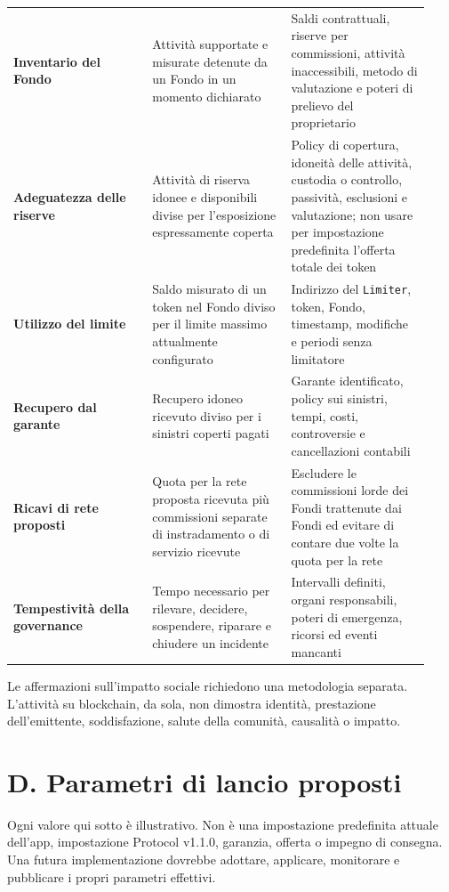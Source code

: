 \documentclass[11pt]{article}
\begin{document}
\begin{longtable}{P{0.31\linewidth} P{0.31\linewidth} P{0.31\linewidth}}
\textbf{Inventario del Fondo} & Attività supportate e misurate detenute da un Fondo in un momento dichiarato & Saldi contrattuali, riserve per commissioni, attività inaccessibili, metodo di valutazione e poteri di prelievo del proprietario \\
\textbf{Adeguatezza delle riserve} & Attività di riserva idonee e disponibili divise per l'esposizione espressamente coperta & Policy di copertura, idoneità delle attività, custodia o controllo, passività, esclusioni e valutazione; non usare per impostazione predefinita l'offerta totale dei token \\
\textbf{Utilizzo del limite} & Saldo misurato di un token nel Fondo diviso per il limite massimo attualmente configurato & Indirizzo del \texttt{Limiter}, token, Fondo, timestamp, modifiche e periodi senza limitatore \\
\textbf{Recupero dal garante} & Recupero idoneo ricevuto diviso per i sinistri coperti pagati & Garante identificato, policy sui sinistri, tempi, costi, controversie e cancellazioni contabili \\
\textbf{Ricavi di rete proposti} & Quota per la rete proposta ricevuta più commissioni separate di instradamento o di servizio ricevute & Escludere le commissioni lorde dei Fondi trattenute dai Fondi ed evitare di contare due volte la quota per la rete \\
\textbf{Tempestività della governance} & Tempo necessario per rilevare, decidere, sospendere, riparare e chiudere un incidente & Intervalli definiti, organi responsabili, poteri di emergenza, ricorsi ed eventi mancanti \\
\bottomrule
\end{longtable}

Le affermazioni sull'impatto sociale richiedono una metodologia separata. L'attività su blockchain, da sola, non dimostra identità, prestazione dell'emittente, soddisfazione, salute della comunità, causalità o impatto.


\section*{D. Parametri di lancio proposti}

Ogni valore qui sotto è illustrativo. Non è una impostazione predefinita attuale dell'app, impostazione Protocol v1.1.0, garanzia, offerta o impegno di consegna. Una futura implementazione dovrebbe adottare, applicare, monitorare e pubblicare i propri parametri effettivi.
\end{document}
